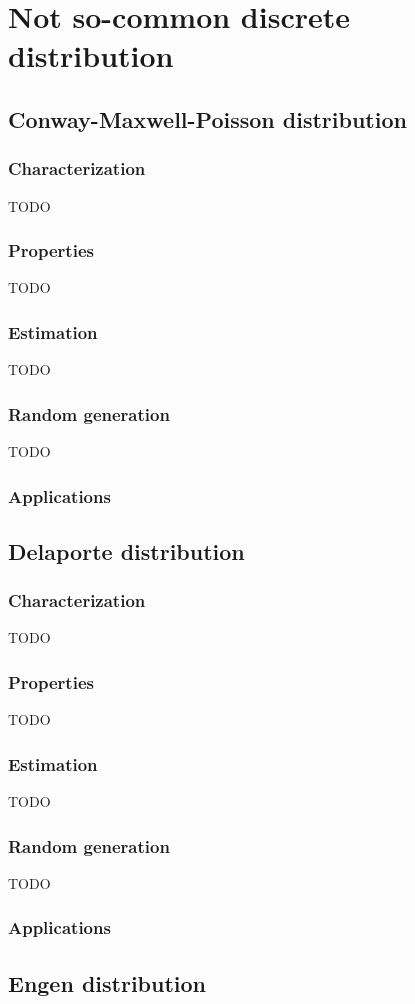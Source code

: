 \chapter{Not so-common discrete distribution}
\section{Conway-Maxwell-Poisson distribution}
\subsection{Characterization}
TODO
\subsection{Properties}
TODO
\subsection{Estimation}
TODO
\subsection{Random generation}
TODO
\subsection{Applications}

\section{Delaporte distribution}
\subsection{Characterization}
TODO
\subsection{Properties}
TODO
\subsection{Estimation}
TODO
\subsection{Random generation}
TODO
\subsection{Applications}

\section{Engen distribution}
